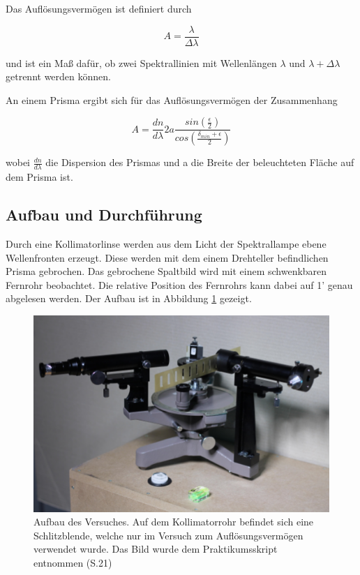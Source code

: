 \documentclass[12pt,a4paper]{article}
\begin{document}
Das Auflösungsvermögen ist definiert durch

\begin{equation}
A = \frac{\lambda}{\Delta \lambda}
\end{equation} 

und ist ein Maß dafür, ob zwei Spektrallinien mit Wellenlängen $\lambda$ und $\lambda + \Delta \lambda$ getrennt werden können.

An einem Prisma ergibt sich für das Auflösungsvermögen der Zusammenhang

\begin{equation}
A = \frac{dn}{d\lambda} 2a \frac{sin(\frac{\epsilon}{2})}{cos(\frac{\delta_{min}+\epsilon}{2})}
\end{equation}

wobei $\frac{dn}{d\lambda}$ die Dispersion des Prismas und a die Breite der beleuchteten Fläche auf dem Prisma ist.



\subsection{Aufbau und Durchführung}
Durch eine Kollimatorlinse werden aus dem Licht der Spektrallampe ebene Wellenfronten erzeugt. Diese werden mit dem einem Drehteller befindlichen Prisma gebrochen. Das gebrochene Spaltbild wird mit einem schwenkbaren Fernrohr beobachtet. Die relative Position des Fernrohrs kann dabei auf 1' genau abgelesen werden.
Der Aufbau ist in Abbildung \ref{fig:AufbauPrisma} gezeigt.

\begin{figure}
\begin{center}
\includegraphics[scale=1.0]{Bilder/AufbauPrisma}
\caption{Aufbau des Versuches. Auf dem Kollimatorrohr befindet sich eine Schlitzblende, welche nur im Versuch zum Auflösungsvermögen verwendet wurde. Das Bild wurde dem Praktikumsskript entnommen (S.21)}
\label{fig:AufbauPrisma}
\end{center}
\end{figure}
\end{document}

